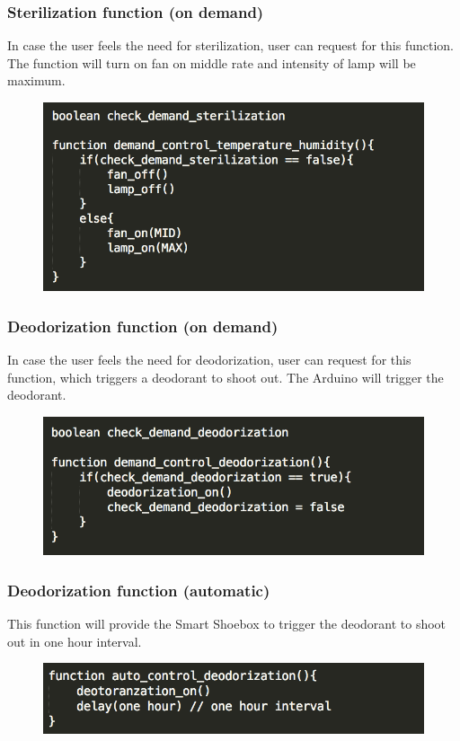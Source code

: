 \documentclass[conference]{IEEEtran}
\begin{document}
\subsubsection{Sterilization function (on demand)}
In case the user feels the need for sterilization, user can request for this function. The function will turn on fan on middle rate and intensity of lamp will be maximum.
\begin{figure}[H]
\begin{center}
    \includegraphics[scale=0.6]{optimization3}
    \label{fig:label}
\end{center}
\end{figure}
\subsubsection{Deodorization function (on demand)}
In case the user feels the need for deodorization, user can request for this function, which triggers a deodorant to shoot out. The Arduino will trigger the deodorant.
\begin{figure}[H]
\begin{center}
    \includegraphics[scale=0.6]{optimization4}
    \label{fig:label}
\end{center}
\end{figure}
\subsubsection{Deodorization function (automatic)}
This function will provide the Smart Shoebox to trigger the deodorant to shoot out in one hour interval. 
\begin{figure}[H]
\begin{center}
    \includegraphics[scale=0.6]{optimization5}
    \label{fig:label}
\end{center}
\end{figure}
\end{document}
